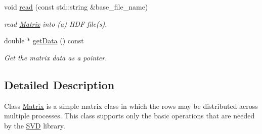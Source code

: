 \begin{DoxyCompactItemize}
void \hyperlink{class_c_a_r_o_m_1_1_matrix_acdc4a8fd238f64d8106b8f1ba8f2384e}{read} (const std\-::string \&base\-\_\-file\-\_\-name)
\begin{DoxyCompactList}\small\item\em read \hyperlink{class_c_a_r_o_m_1_1_matrix}{Matrix} into (a) H\-D\-F file(s). \end{DoxyCompactList}\item 
\hypertarget{class_c_a_r_o_m_1_1_matrix_a951b1d63fafbc9b4ddd112bd400ca758}{double $\ast$ \hyperlink{class_c_a_r_o_m_1_1_matrix_a951b1d63fafbc9b4ddd112bd400ca758}{get\-Data} () const }\label{class_c_a_r_o_m_1_1_matrix_a951b1d63fafbc9b4ddd112bd400ca758}

\begin{DoxyCompactList}\small\item\em Get the matrix data as a pointer. \end{DoxyCompactList}\end{DoxyCompactItemize}


\subsection{Detailed Description}
Class \hyperlink{class_c_a_r_o_m_1_1_matrix}{Matrix} is a simple matrix class in which the rows may be distributed across multiple processes. This class supports only the basic operations that are needed by the \hyperlink{class_c_a_r_o_m_1_1_s_v_d}{S\-V\-D} library. 

